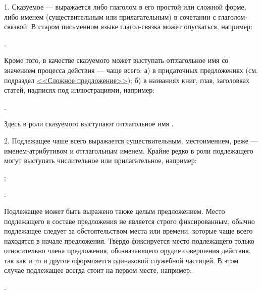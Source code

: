 1. Сказуемое --- выражается либо глаголом в его простой или сложной форме, либо именем (существительным или прилагательным) в сочетании с глаголом-связкой. В старом письменном языке глагол-связка может опускаться, например:
\begin{prfsample}
	\item {}.
\end{prfsample}
Кроме того, в качестве сказуемого может выступать отглагольное имя со значением процесса действия --- чаще всего: а) в придаточных предложениях (см. подраздел \hyperref[sec:sintaks:slozhn]{<<Сложное предложение>>}); б) в названиях книг, глав, заголовках статей, надписях  под иллюстрациями, например:
\begin{prfsample}
	\item {}.
\end{prfsample}
Здесь в роли сказуемого выступают отглагольное имя .

2. Подлежащее чаше всего выражается существительным, местоимением, реже --- именем-атрибутивом и отглагольным именем. Крайне редко в роли подлежащего могут выступать числительное или прилагательное, например:
\begin{prfsample}
	\item {};
	\item {}.
\end{prfsample}
Подлежащее может быть выражено также целым предложением. Место подлежащего в составе предложения не является строго фиксированным, обычно подлежащее следует за обстоятельством места или времени, которые чаще всего находятся в начале предложения. Твёрдо фиксируется место подлежащего только относительно члена предложения, обозначающего орудие совершения действия, так как и то и другое оформляется одинаковой служебной частицей. В этом случае подлежащее всегда стоит на первом месте, например:
\begin{prfsample}
	\item {}.
\end{prfsample}

